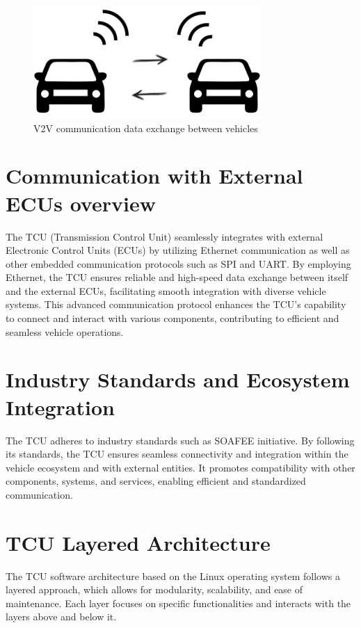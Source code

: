 \documentclass[
12pt,
oneside, 
onehalfspacing, 
nolistspacing, 
parskip, 
chapterinoneline, 
]{AASTCOMPUTER}
\begin{document}
\begin{figure}[!ht]
\centering
\includegraphics[scale=0.5]{Figures/V2V communication data exchange between vehicles.png}
\caption[V2V Communication overview]{V2V communication data exchange between vehicles}
\label{fig:V2V communication data exchange between vehicles}
\end{figure}
 


\section{Communication with External ECUs overview}
The TCU (Transmission Control Unit) seamlessly integrates with external Electronic Control Units (ECUs) by utilizing Ethernet communication as well as other embedded communication protocols such as SPI and UART. By employing Ethernet, the TCU ensures reliable and high-speed data exchange between itself and the external ECUs, facilitating smooth integration with diverse vehicle systems. This advanced communication protocol enhances the TCU's capability to connect and interact with various components, contributing to efficient and seamless vehicle operations.

\section{Industry Standards and Ecosystem Integration}
The TCU adheres to industry standards such as SOAFEE initiative. By following its standards, the TCU ensures seamless connectivity and integration within the vehicle ecosystem and with external entities. It promotes compatibility with other components, systems, and services, enabling efficient and standardized communication.

\section{TCU Layered Architecture}



The TCU software architecture based on the Linux operating system follows a layered approach, which allows for modularity, scalability, and ease of maintenance. Each layer focuses on specific functionalities and interacts with the layers above and below it.
\end{document}
